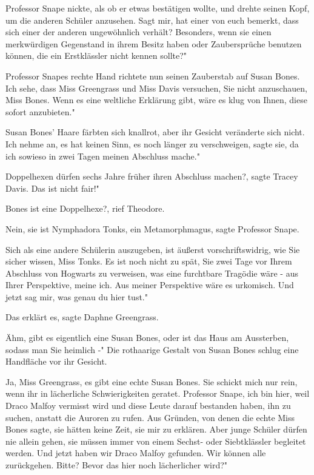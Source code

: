 Professor Snape nickte, als ob er etwas bestätigen wollte, und drehte seinen
Kopf, um die anderen Schüler anzusehen. \glqq Sagt mir, hat einer von euch
bemerkt, dass sich einer der anderen ungewöhnlich verhält? Besonders, wenn sie
einen merkwürdigen Gegenstand in ihrem Besitz haben oder Zaubersprüche benutzen
können, die ein Erstklässler nicht kennen sollte?"

Professor Snapes rechte Hand richtete nun seinen Zauberstab auf Susan Bones.
\glqq Ich sehe, dass Miss Greengrass und Miss Davis versuchen, Sie nicht
anzuschauen, Miss Bones. Wenn es eine weltliche Erklärung gibt, wäre es klug von
Ihnen, diese sofort anzubieten."

Susan Bones' Haare färbten sich knallrot, aber ihr Gesicht veränderte sich
nicht. \glqq Ich nehme an, es hat keinen Sinn, es noch länger zu
verschweigen\grqq{}, sagte sie, \glqq da ich sowieso in zwei Tagen meinen
Abschluss mache."

\glqq Doppelhexen dürfen sechs Jahre früher ihren Abschluss machen?\grqq{},
sagte Tracey Davis. \glqq Das ist nicht fair!"

\glqq Bones ist eine Doppelhexe?\grqq{}, rief Theodore.

\glqq Nein, sie ist Nymphadora Tonks, ein Metamorphmagus\grqq{}, sagte Professor
Snape.

\glqq Sich als eine andere Schülerin auszugeben, ist äußerst vorschriftswidrig,
wie Sie sicher wissen, Miss Tonks. Es ist noch nicht zu spät, Sie zwei Tage vor
Ihrem Abschluss von Hogwarts zu verweisen, was eine furchtbare Tragödie wäre -
aus Ihrer Perspektive, meine ich. Aus meiner Perspektive wäre es urkomisch. Und
jetzt sag mir, was genau du hier tust."

\glqq Das erklärt es\grqq{}, sagte Daphne Greengrass.

\glqq Ähm, gibt es eigentlich eine Susan Bones, oder ist das Haus am Aussterben,
sodass man Sie heimlich -" Die rothaarige Gestalt von Susan Bones schlug eine
Handfläche vor ihr Gesicht.

\glqq Ja, Miss Greengrass, es gibt eine echte Susan Bones. Sie schickt mich nur
rein, wenn ihr in lächerliche Schwierigkeiten geratet. Professor Snape, ich bin
hier, weil Draco Malfoy vermisst wird und diese Leute darauf bestanden haben,
ihn zu suchen, anstatt die Auroren zu rufen. Aus Gründen, von denen die echte
Miss Bones sagte, sie hätten keine Zeit, sie mir zu erklären. Aber junge Schüler
dürfen nie allein gehen, sie müssen immer von einem Sechst- oder Siebtklässler
begleitet werden. Und jetzt haben wir Draco Malfoy gefunden. Wir können alle
zurückgehen. Bitte? Bevor das hier noch lächerlicher wird?"

